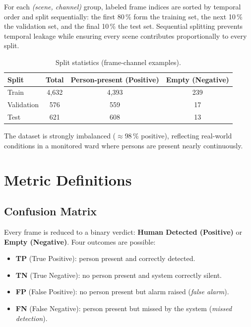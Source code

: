 \documentclass[11pt, a4paper]{article}
\begin{document}
For each \emph{(scene, channel)} group, labeled frame indices are sorted by temporal
order and split sequentially: the first 80\,\% form the training set, the next 10\,\%
the validation set, and the final 10\,\% the test set.  Sequential splitting prevents
temporal leakage while ensuring every scene contributes proportionally to every split.

\begin{table}[H]
\centering
\caption{Split statistics (frame-channel examples).}
\renewcommand{\arraystretch}{1.3}
\begin{tabular}{lccc}
\toprule
\textbf{Split} & \textbf{Total}
    & \textbf{Person-present (Positive)}
    & \textbf{Empty (Negative)} \\
\midrule
Train      & 4{,}632 & 4{,}393 & 239 \\
Validation &    576  &    559  &  17 \\
Test       &    621  &    608  &  13 \\
\bottomrule
\end{tabular}
\label{tab:split}
\end{table}

The dataset is strongly imbalanced ($\approx 98$\,\% positive), reflecting real-world
conditions in a monitored ward where persons are present nearly continuously.

\section{Metric Definitions}

\subsection{Confusion Matrix}

Every frame is reduced to a binary verdict: \textbf{Human Detected (Positive)} or
\textbf{Empty (Negative)}.  Four outcomes are possible:

\begin{itemize}[leftmargin=2em]
    \item \textbf{TP} (True Positive): person present and correctly detected.
    \item \textbf{TN} (True Negative): no person present and system correctly silent.
    \item \textbf{FP} (False Positive): no person present but alarm raised
          (\emph{false alarm}).
    \item \textbf{FN} (False Negative): person present but missed by the system
          (\emph{missed detection}).
\end{itemize}
\end{document}
